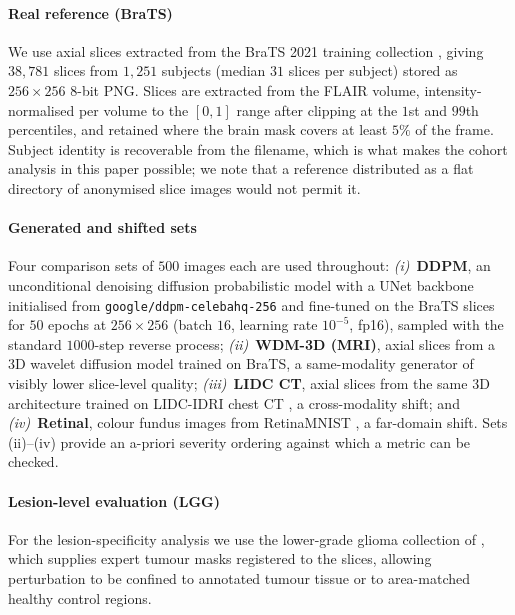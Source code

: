 \documentclass[preprint,12pt,authoryear]{elsarticle}
\begin{document}
\paragraph{Real reference (BraTS)}
We use axial slices extracted from the BraTS 2021 training collection
\citep{baid2021rsna}, giving $38{,}781$ slices from $1{,}251$ subjects
(median $31$ slices per subject) stored as $256\times256$ 8-bit PNG. Slices are
extracted from the FLAIR volume, intensity-normalised per volume to the
$[0,1]$ range after clipping at the $1$st and $99$th percentiles, and retained
where the brain mask covers at least $5\%$ of the frame. Subject identity is
recoverable from the filename, which is what makes the cohort analysis in this
paper possible; we note that a reference distributed as a flat directory of
anonymised slice images would not permit it.

\paragraph{Generated and shifted sets}
Four comparison sets of $500$ images each are used throughout:
\emph{(i)}~\textbf{DDPM}, an unconditional denoising diffusion probabilistic
model \citep{ho2020denoising} with a UNet backbone initialised from
\texttt{google/ddpm-celebahq-256} and fine-tuned on the BraTS slices for $50$
epochs at $256\times256$ (batch $16$, learning rate $10^{-5}$, fp16), sampled
with the standard $1000$-step reverse process;
\emph{(ii)}~\textbf{WDM-3D (MRI)}, axial slices from a 3D wavelet diffusion
model \citep{friedrich2024wdm} trained on BraTS, a same-modality generator of
visibly lower slice-level quality;
\emph{(iii)}~\textbf{LIDC CT}, axial slices from the same 3D architecture
trained on LIDC-IDRI chest CT \citep{armato2011lidc}, a cross-modality shift;
and \emph{(iv)}~\textbf{Retinal}, colour fundus images from RetinaMNIST
\citep{yang2023medmnist}, a far-domain shift. Sets (ii)--(iv) provide an
a-priori severity ordering against which a metric can be checked.

\paragraph{Lesion-level evaluation (LGG)}
For the lesion-specificity analysis we use the lower-grade glioma collection of
\citet{buda2019association}, which supplies expert tumour masks registered to
the slices, allowing perturbation to be confined to annotated tumour tissue or
to area-matched healthy control regions.
\end{document}

